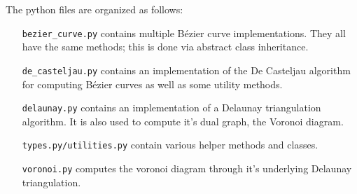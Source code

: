 The python files are organized as follows:
\begin{itemize}
    \item[\texttt{bezier\_curve.py}] contains multiple Bézier curve implementations. They all have the same methods; this is done via abstract class inheritance.
    \item[\texttt{de\_casteljau.py}] contains an implementation of the De Casteljau algorithm for computing Bézier curves as well as some utility methods.
    \item[\texttt{delaunay.py}] contains an implementation of a Delaunay triangulation algorithm. It is also used to compute it's dual graph, the Voronoi diagram.
    \item[\texttt{types.py/utilities.py}] contain various helper methods and classes.
    \item[\texttt{voronoi.py}] computes the voronoi diagram through it's underlying Delaunay triangulation.
\end{itemize}
